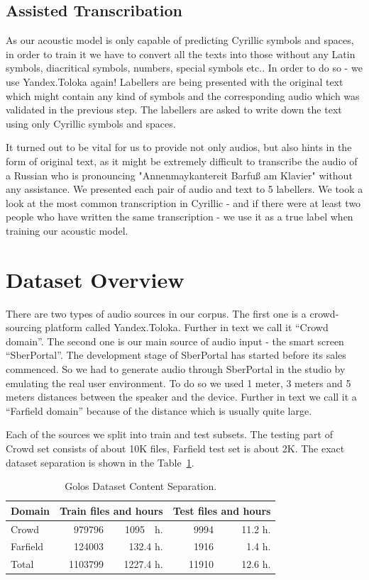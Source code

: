 \documentclass[a4paper]{article}
\begin{document}
\subsection{Assisted Transcribation}
As our acoustic model is only capable of predicting Cyrillic symbols and spaces, in order to train it we have to convert all the texts into those without any Latin symbols, diacritical symbols, numbers, special symbols etc.. In order to do so - we use Yandex.Toloka again! Labellers are being presented with the original text which might contain any kind of symbols and the corresponding audio which was validated in the previous step. The labellers are asked to write down the text using only Cyrillic symbols and spaces. 

It turned out to be vital for us to provide not only audios, but also hints in the form of original text, as it might be extremely difficult to transcribe the audio of a Russian who is pronouncing "Annenmaykantereit Barfuß am Klavier"  without any assistance. We presented each pair of audio and text to 5 labellers. We took a look at the most common transcription in Cyrillic - and if there were at least two people who have written the same transcription - we use it as a true label when training our acoustic model.


\section{Dataset Overview}

There are two types of audio sources in our corpus. The first one is a crowd-sourcing platform called Yandex.Toloka. Further in text we call it “Crowd domain”. The second one is our main source of audio input - the smart screen “SberPortal”. The development stage of SberPortal has started before its sales commenced. So we had to generate audio through SberPortal in the studio by emulating the real user environment. To do so we used 1 meter, 3 meters and 5 meters distances between the speaker and the device. Further in text we call it a “Farfield domain” because of the distance which is usually quite large.

Each of the sources we split into train and test subsets. The testing part of Crowd set consists of about 10K files, Farfield test set is about 2K. The exact dataset separation is shown in the Table~\ref{tab:dataset_separation}. 

\begin{table}[th]
  \caption{Golos Dataset Content Separation.}
  \label{tab:dataset_separation}
  \centering
  \begin{tabular}{ l|r|r|r|r }
    \toprule
    \multicolumn{1}{l|}{\textbf{Domain}} & \multicolumn{2}{c|}{\textbf{Train files and hours}} & \multicolumn{2}{c}{\textbf{Test files and hours}} \\
    \midrule
    Crowd  & 979796 & 1095~~h.  & 9994 & 11.2 h. \\
    Farfield & 124003 & 132.4 h. &  1916 & 1.4 h. \\
    \bottomrule
    Total  & 1103799 & 1227.4 h. & 11910 & 12.6 h. \\
  \end{tabular}
\end{table}
\end{document}
